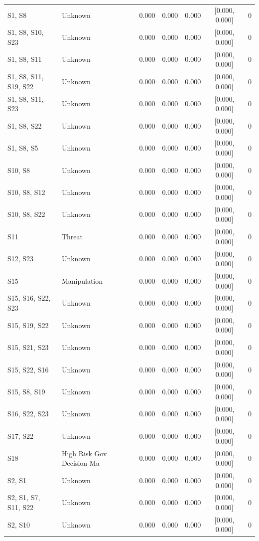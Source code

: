 \begin{table}[h]
\begin{tabular}{llccccr}
S1, S8 & Unknown & 0.000 & 0.000 & 0.000 & [0.000, 0.000] & 0 \\
S1, S8, S10, S23 & Unknown & 0.000 & 0.000 & 0.000 & [0.000, 0.000] & 0 \\
S1, S8, S11 & Unknown & 0.000 & 0.000 & 0.000 & [0.000, 0.000] & 0 \\
S1, S8, S11, S19, S22 & Unknown & 0.000 & 0.000 & 0.000 & [0.000, 0.000] & 0 \\
S1, S8, S11, S23 & Unknown & 0.000 & 0.000 & 0.000 & [0.000, 0.000] & 0 \\
S1, S8, S22 & Unknown & 0.000 & 0.000 & 0.000 & [0.000, 0.000] & 0 \\
S1, S8, S5 & Unknown & 0.000 & 0.000 & 0.000 & [0.000, 0.000] & 0 \\
S10, S8 & Unknown & 0.000 & 0.000 & 0.000 & [0.000, 0.000] & 0 \\
S10, S8, S12 & Unknown & 0.000 & 0.000 & 0.000 & [0.000, 0.000] & 0 \\
S10, S8, S22 & Unknown & 0.000 & 0.000 & 0.000 & [0.000, 0.000] & 0 \\
S11 & Threat & 0.000 & 0.000 & 0.000 & [0.000, 0.000] & 0 \\
S12, S23 & Unknown & 0.000 & 0.000 & 0.000 & [0.000, 0.000] & 0 \\
S15 & Manipulation & 0.000 & 0.000 & 0.000 & [0.000, 0.000] & 0 \\
S15, S16, S22, S23 & Unknown & 0.000 & 0.000 & 0.000 & [0.000, 0.000] & 0 \\
S15, S19, S22 & Unknown & 0.000 & 0.000 & 0.000 & [0.000, 0.000] & 0 \\
S15, S21, S23 & Unknown & 0.000 & 0.000 & 0.000 & [0.000, 0.000] & 0 \\
S15, S22, S16 & Unknown & 0.000 & 0.000 & 0.000 & [0.000, 0.000] & 0 \\
S15, S8, S19 & Unknown & 0.000 & 0.000 & 0.000 & [0.000, 0.000] & 0 \\
S16, S22, S23 & Unknown & 0.000 & 0.000 & 0.000 & [0.000, 0.000] & 0 \\
S17, S22 & Unknown & 0.000 & 0.000 & 0.000 & [0.000, 0.000] & 0 \\
S18 & High Risk Gov Decision Ma & 0.000 & 0.000 & 0.000 & [0.000, 0.000] & 0 \\
S2, S1 & Unknown & 0.000 & 0.000 & 0.000 & [0.000, 0.000] & 0 \\
S2, S1, S7, S11, S22 & Unknown & 0.000 & 0.000 & 0.000 & [0.000, 0.000] & 0 \\
S2, S10 & Unknown & 0.000 & 0.000 & 0.000 & [0.000, 0.000] & 0 \\

\end{tabular}
\end{table}
